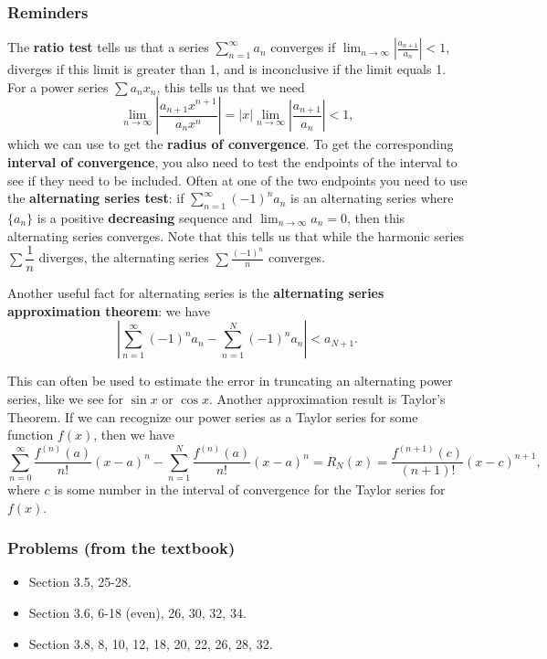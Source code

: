 \documentclass[12pt]{article}
\newcommand{\di}{\displaystyle}
\newcommand{\abs}[1]{\lvert #1\rvert}
\begin{document}
\thispagestyle{fancy}

\subsubsection*{Reminders}
The \textbf{ratio test} tells us that a series $\di\sum_{n=1}^\infty a_n$ converges if $\di\lim_{n\to\infty}\left\lvert \frac{a_{n+1}}{a_n}\right\rvert <1$, diverges if this limit is greater than 1, and is inconclusive if the limit equals 1. For a power series $\sum a_n x_n$, this tells us that we need
\[
 \lim_{n\to\infty}\left\lvert \frac{a_{n+1}x^{n+1}}{a_nx^n}\right\rvert = \abs{x}\lim_{n\to \infty}\left\lvert\frac{a_{n+1}}{a_n}\right\rvert <1,
\]
which we can use to get the \textbf{radius of convergence}. To get the corresponding \textbf{interval of convergence}, you also need to test the endpoints of the interval to see if they need to be included. Often at one of the two endpoints you need to use the \textbf{alternating series test}: if $\di \sum_{n=1}^\infty(-1)^na_n$ is an alternating series where $\{a_n\}$ is a positive \textbf{decreasing} sequence and $\di\lim_{n\to\infty}a_n = 0$, then this alternating series converges. Note that this tells us that while the harmonic series $\sum \dfrac{1}{n}$ diverges, the alternating series $\sum \frac{(-1)^n}{n}$ converges.

Another useful fact for alternating series is the \textbf{alternating series approximation theorem}: we have
\[
 \left\lvert \sum_{n=1}^\infty (-1)^na_n-\sum_{n=1}^N(-1)^na_n\right\rvert < a_{N+1}.
\]

This can often be used to estimate the error in truncating an alternating power series, like we see for $\sin x$ or $\cos x$. Another approximation result is Taylor's Theorem. If we can recognize our power series as a Taylor series for some function $f(x)$, then we have
\[
 \sum_{n=0}^\infty \frac{f^{(n)}(a)}{n!}(x-a)^n - \sum_{n=1}^N\frac{f^{(n)}(a)}{n!}(x-a)^n = R_N(x) = \frac{f^{(n+1)}(c)}{(n+1)!}(x-c)^{n+1},
\]
where $c$ is some number in the interval of convergence for the Taylor series for $f(x)$.



\subsubsection*{Problems (from the textbook)}

\begin{itemize}
 \item Section 3.5, 25-28.
 \item Section 3.6, 6-18 (even), 26, 30, 32, 34.
 \item Section 3.8, 8, 10, 12, 18, 20, 22, 26, 28, 32.
\end{itemize}
\end{document}

